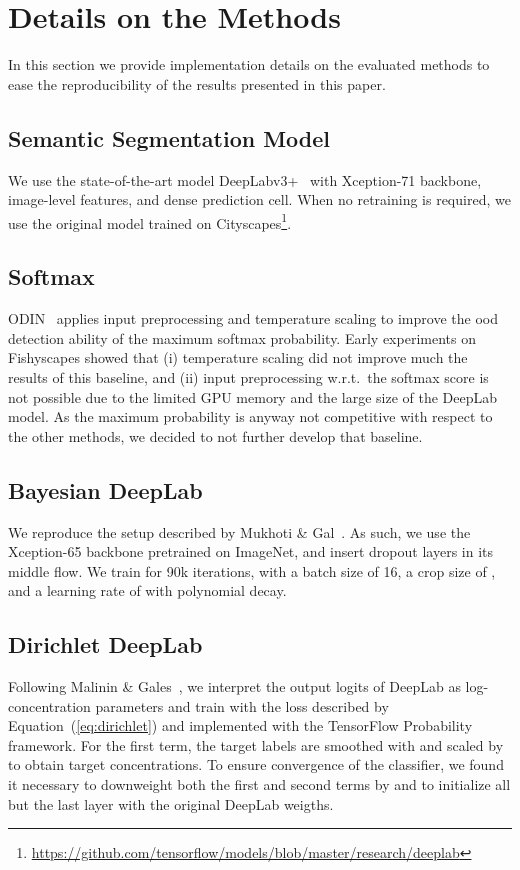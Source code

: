 \section{Details on the Methods}
\label{sec:details:methods}
In this section we provide implementation details on the evaluated methods to ease the reproducibility of the results presented in this paper.

\subsection{Semantic Segmentation Model}
We use the state-of-the-art model DeepLabv3+~\cite{Chen2018-bp} with Xception-71 backbone, image-level features, and dense prediction cell. When no retraining is required, we use the original model trained on Cityscapes\footnote{\url{https://github.com/tensorflow/models/blob/master/research/deeplab}}.

\subsection{Softmax}
ODIN~\cite{Liang2017-mj} applies input preprocessing and temperature scaling to improve the \ac{ood} detection ability of the maximum softmax probability. Early experiments on Fishyscapes showed that (i) temperature scaling did not improve much the results of this baseline, and (ii) input preprocessing w.r.t.\ the softmax score is not possible due to the limited GPU memory and the large size of the DeepLab model. As the maximum probability is anyway not competitive with respect to the other methods, we decided to not further develop that baseline.








\subsection{Bayesian DeepLab}
We reproduce the setup described by Mukhoti \& Gal~\cite{Mukhoti2018-af}. As such, we use the Xception-65 backbone pretrained on ImageNet, and insert dropout layers in its middle flow. We train for 90k iterations, with a batch size of 16, a crop size of , and a learning rate of  with polynomial decay.

\subsection{Dirichlet DeepLab}
Following Malinin \& Gales~\cite{Malinin2018-pl}, we interpret the output logits of DeepLab as log-concentration parameters  and train with the loss described by Equation~(\ref{eq:dirichlet}) and implemented with the TensorFlow Probability~\cite{dillon2017tensorflow} framework. For the first term, the target labels are smoothed with  and scaled by  to obtain target concentrations. To ensure convergence of the classifier, we found it necessary to downweight both the first and second terms by  and to initialize all but the last layer with the original DeepLab weigths.

